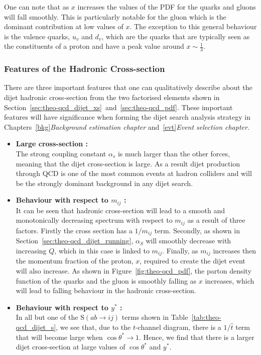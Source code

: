 One can note that as $x$ increases the values of the PDF for the quarks and gluons will fall smoothly.
This is particularly notable for the gluon which is the dominant contribution at low values of $x$.
The exception to this general behaviour is the valence quarks,
$u_v$ and $d_v$,
which are the quarks that are typically seen as the constituents of a proton and have a peak value around $x \sim \frac{1}{3}$.

\subsubsection{Features of the Hadronic Cross-section}

There are three important features that one can qualitatively describe about the dijet hadronic cross-section
from the two factorised elements shown in Section~\ref{sec:theo-qcd_dijet_xs}~and~\ref{sec:theo-qcd_pdf}.
These important features will have significance when forming the dijet search analysis strategy in
Chapters~\ref{bkg}\textit{Background estimation chapter} and~\ref{evt}\textit{Event selection chapter}.

\begin{itemize}[leftmargin=*]
\item\textbf{Large cross-section :}\\
  The strong coupling constant $\alpha_s$ is much larger than the other forces,
  meaning that the dijet cross-section is large.
  As a result dijet production through QCD is one of the most common events at hadron colliders
  and will be the strongly dominant background in any dijet search.\vspace{0.5em}
\item\textbf{Behaviour with respect to $m_{ij}$ :}\\
  It can be seen that hadronic cross-section will
  lead to a smooth and monotonically decreasing spectrum
  with respect to $m_{ij}$ as a result of three factors.
  Firstly the cross section has a $1/m_{ij}$ term.
  Secondly, as shown in Section~\ref{sec:theo-qcd_dijet_running},
  $\alpha_S$ will smoothly decrease with increasing $Q$, which in this case is linked to $m_{ij}$.
  Finally, as $m_{ij}$ increases then the momentum fraction of the proton, $x$, required to create
  the dijet event will also increase.
  As shown in Figure~\ref{fig:theo-qcd_pdf}, the parton density function of the quarks and the gluon
  is smoothly falling as $x$ increases, which will lead to falling behaviour in the hadronic cross-section.
  \vspace{0.5em}
\item\textbf{Behaviour with respect to $y^*$ :}\\
  In all but one of the $\text{S}(ab \to ij)$ terms shown in Table~\ref{tab:theo-qcd_dijet_s},
  we see that, due to the $t$-channel diagram, there is a $1/\hat{t}$ term that will become large when $\cos{\theta^*} \to 1$.
  Hence, we find that there is a larger dijet cross-section at large values of $\cos{\theta^*}$ and $y^*$.
  \vspace{0.5em}
\end{itemize}

